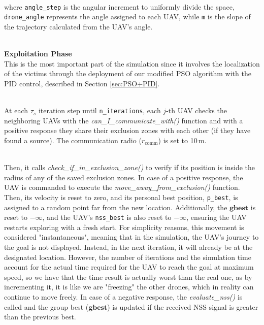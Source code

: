 \documentclass[main]{subfiles}
\begin{document}
\noindent\\
where \texttt{angle\_step} is the angular increment to uniformly divide the space,
\texttt{drone\_angle} represents the angle assigned to each UAV, 
while \texttt{m} is the slope of the trajectory calculated from the UAV's angle. 

\noindent\\
\textbf{Exploitation Phase}\noindent\\
This is the most important part of the simulation since it involves
the localization of the victims through the deployment of our modified PSO
algorithm with the PID control, described in Section \ref{sec:PSO+PID}.

\noindent\\
At each $\tau_s$ iteration step until \texttt{n\_iterations},
each $j$-th UAV checks the neighboring UAVs with the
\textit{can\_I\_communicate\_with()} function and with a 
positive response they share their exclusion zones with each other
(if they have found a source). The communication radio (\(r_{\text{comm}}\))
is set to 10\,m.

\noindent\\
Then, it calls \textit{check\_if\_in\_exclusion\_zone()}
to verify if its position is inside the radius of any of the 
saved exclusion zones.
In case of a positive response, the UAV is commanded to 
execute the \textit{move\_away\_from\_exclusion()} function. 
Then, its velocity is reset to zero, and its personal 
best position, \texttt{p\_best}, is assigned to a random point 
far from the new location. Additionally, the $\mathbf{gbest}$ 
is reset to \(-\infty\), and the 
UAV's \texttt{nss\_best} is also reset to \(-\infty\), 
ensuring the UAV restarts exploring with a fresh start.
For simplicity reasons, this movement is considered "instantaneous", 
meaning that in the simulation, the UAV's journey to the goal is 
not displayed. Instead, in the next iteration, it will already 
be at the designated location. However, the number of 
iterations and the simulation time account for the actual 
time required for the UAV to reach the goal at maximum speed,
so we have that the time result is actually worst than the real one,
as by incrementing it, it is like we are "freezing" the other drones, which in reality can continue
to move freely.
In case of a negative response, the \textit{evaluate\_nss()} is 
called and the group best ($\mathbf{gbest}$) is updated if the received NSS signal 
is greater than the previous best.
\end{document}
